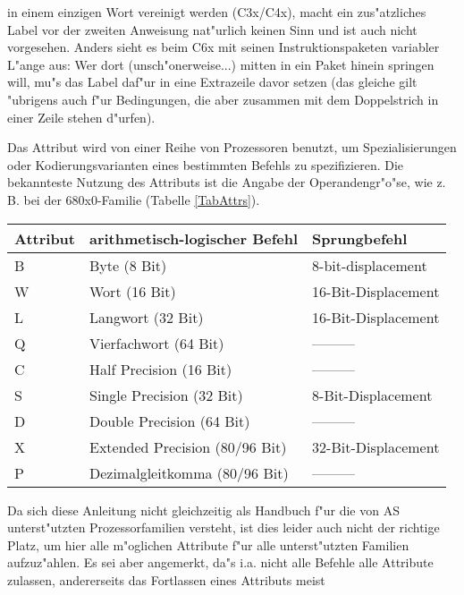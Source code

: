 \documentclass[12pt,a4paper,twoside]{report}
\begin{document}
in einem einzigen Wort vereinigt werden (C3x/C4x), macht ein zus"atzliches
Label vor der zweiten Anweisung nat"urlich keinen Sinn und ist auch nicht
vorgesehen.  Anders sieht es beim C6x mit seinen Instruktionspaketen
variabler L"ange aus: Wer dort (unsch"onerweise...) mitten in ein Paket
hinein springen will, mu"s das Label daf"ur in eine Extrazeile davor setzen
(das gleiche gilt "ubrigens auch f"ur Bedingungen, die aber zusammen mit
dem Doppelstrich in einer Zeile stehen d"urfen).
\par
Das Attribut wird von einer Reihe von Prozessoren benutzt, um
Spezialisierungen oder Kodierungsvarianten eines bestimmten Befehls zu
spezifizieren.  Die bekannteste Nutzung des Attributs ist die Angabe der
Operandengr"o"se, wie z. B. bei der 680x0-Familie (Tabelle
\ref{TabAttrs}).
\begin{table*}[htb]
\begin{center}\begin{tabular}{|l|l|l|}
\hline
Attribut & arithmetisch-logischer Befehl & Sprungbefehl \\
\hline
\hline
B     & Byte (8 Bit)                   & 8-bit-displacement \\
W     & Wort (16 Bit)                  & 16-Bit-Displacement \\
L     & Langwort (32 Bit)              & 16-Bit-Displacement \\
Q     & Vierfachwort (64 Bit)          & --------- \\
C     & Half Precision (16 Bit)        & --------- \\
S     & Single Precision (32 Bit)      & 8-Bit-Displacement \\
D     & Double Precision (64 Bit)      & --------- \\
X     & Extended Precision (80/96 Bit) & 32-Bit-Displacement \\
P     & Dezimalgleitkomma (80/96 Bit)  & --------- \\
\hline
\end{tabular}\end{center}
\caption{Erlaubte Attribute (Beispiel 680x0) \label{TabAttrs}}
\end{table*}
\par
Da sich diese Anleitung nicht gleichzeitig als Handbuch f"ur die von AS
unterst"utzten Prozessorfamilien versteht, ist dies leider auch nicht der
richtige Platz, um hier alle m"oglichen Attribute f"ur alle unterst"utzten
Familien aufzuz"ahlen.  Es sei aber angemerkt, da"s i.a. nicht alle Befehle
alle Attribute zulassen, andererseits das Fortlassen eines Attributs meist
\end{document}
